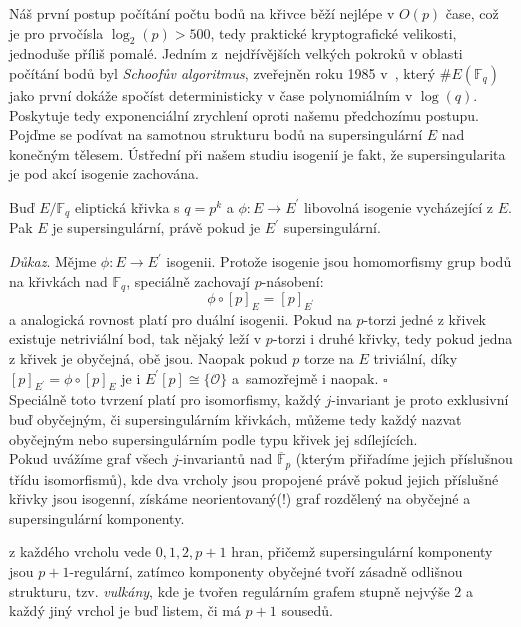 \documentclass [12pt]{report}
\begin{document}
Náš první postup počítání počtu bodů na křivce běží nejlépe v $O(p)$ čase, což je pro prvočísla  $\log_2(p) > 500$, tedy praktické kryptografické velikosti, jednoduše příliš pomalé. Jedním z~nejdřívějších velkých pokroků v oblasti počítání bodů byl \textit{Schoofův algoritmus}, zveřejněn roku 1985 v~\cite{Schoof}, který $\# E(\mathbb{F}_q)$ jako první dokáže spočíst deterministicky v čase polynomiálním v $\log(q)$. Poskytuje tedy exponenciální zrychlení oproti našemu předchozímu postupu.\\ 


Pojďme se podívat na samotnou strukturu bodů na supersingulární $E$ nad konečným tělesem. Ústřední při našem studiu isogenií je fakt, že supersingularita je pod akcí isogenie zachována. 

\begin{veta}
Buď $E/\mathbb{F}_q$ eliptická křivka s $q = p^k$ a $\phi : E \longrightarrow E^\prime$ libovolná isogenie vycházející z $E$. Pak $E$ je supersingulární, právě pokud je $E^\prime$ supersingulární.
\end{veta}

\noindent \textit{Důkaz}. Mějme $\phi : E \longrightarrow E^\prime$ isogenii. Protože isogenie jsou homomorfismy grup bodů na křivkách nad $\mathbb{F}_q$, speciálně zachovají $p$-násobení:
\begin{equation*}
\phi  \circ[p]_E = [p]_{E^\prime}
\end{equation*}
a analogická rovnost platí pro duální isogenii. Pokud na $p$-torzi jedné z křivek existuje netriviální bod, tak nějaký leží v $p$-torzi i druhé křivky, tedy pokud jedna z křivek je obyčejná, obě jsou. Naopak pokud $p$ torze na $E$ triviální, díky $[p]_{E^\prime} = \phi \circ [p]_E$ je i $E^\prime [p] \cong \lbrace \mathcal{O} \rbrace$ a~samozřejmě i naopak. \hfill $\square$\\

Speciálně toto tvrzení platí pro isomorfismy, každý $j$-invariant je proto exklusivní buď obyčejným, či supersingulárním křivkách, můžeme tedy každý nazvat obyčejným nebo supersingulárním podle typu křivek jej sdílejících.\\

Pokud uvážíme graf všech $j$-invariantů nad $\overline{\mathbb{F}}_p$ (kterým přiřadíme jejich příslušnou třídu isomorfismů), kde dva vrcholy jsou propojené právě pokud jejich příslušné křivky jsou isogenní, získáme neorientovaný(!) graf rozdělený na obyčejné a supersingulární komponenty. 


 z každého vrcholu vede $0,1,2,p+1$ hran, přičemž supersingulární komponenty jsou $p+1$-regulární, zatímco komponenty obyčejné tvoří zásadně odlišnou strukturu, tzv. \textit{vulkány}, kde  je tvořen regulárním grafem stupně nejvýše $2$ a každý jiný vrchol je buď listem, či má $p+1$ sousedů.\\
\end{document}

